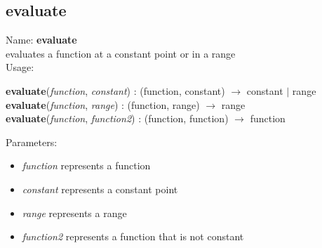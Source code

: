 \subsection{evaluate}
\label{labevaluate}
\noindent Name: \textbf{evaluate}\\
evaluates a function at a constant point or in a range\\

\noindent Usage: 
\begin{center}
\textbf{evaluate}(\emph{function}, \emph{constant}) : (\textsf{function}, \textsf{constant}) $\rightarrow$ \textsf{constant} $|$ \textsf{range}\\
\textbf{evaluate}(\emph{function}, \emph{range}) : (\textsf{function}, \textsf{range}) $\rightarrow$ \textsf{range}\\
\textbf{evaluate}(\emph{function}, \emph{function2}) : (\textsf{function}, \textsf{function}) $\rightarrow$ \textsf{function}\\
\end{center}
Parameters: 
\begin{itemize}
\item \emph{function} represents a function
\item \emph{constant} represents a constant point
\item \emph{range} represents a range
\item \emph{function2} represents a function that is not constant
\end{itemize}
